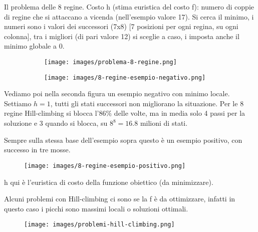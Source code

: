 \begin{example}
    Il problema delle 8 regine. Costo h (stima euristica del costo f): numero di coppie di regine che si attaccano a vicenda (nell'esempio valore 17).
    Si cerca il minimo, i numeri sono i valori dei successori (7x8) [7 posizioni per ogni regina, su ogni colonna], tra i migliori (di pari valore 12) si sceglie a caso,
    i imposta anche il minimo globale a 0.
    \begin{figure}[h!]
        \begin{subfigure}[b]{0.45\textwidth}
            \centering
            \texttt{[image: images/problema-8-regine.png]}
        \end{subfigure}
        \begin{subfigure}[b]{0.45\textwidth}
            \centering
            \texttt{[image: images/8-regine-esempio-negativo.png]}
        \end{subfigure}
    \end{figure}
    \newpage
    Vediamo poi nella seconda figura un esempio negativo con minimo locale. Settiamo $h=1$, tutti gli stati successori non migliorano la situazione. 
    Per le 8 regine Hill-climbing si blocca l'$86\%$ delle volte, ma in media solo 4 passi per la soluzione e 3 quando si blocca, su $8^8 = 16.8$ milioni di stati. 
\end{example}
\begin{example}
    Sempre sulla stessa base dell'esempio sopra questo è un esempio positivo, con successo in tre mosse.
    \begin{figure}[h!]
        \centering
        \texttt{[image: images/8-regine-esempio-positivo.png]}
    \end{figure}
    h qui è l'euristica di costo della funzione obiettico (da minimizzare).
\end{example}
Alcuni problemi con Hill-climbing ci sono se la f è da ottimizzare, infatti in questo caso i picchi sono massimi locali o soluzioni ottimali.
\begin{figure}[h!]
    \centering
    \texttt{[image: images/problemi-hill-climbing.png]}
\end{figure}

